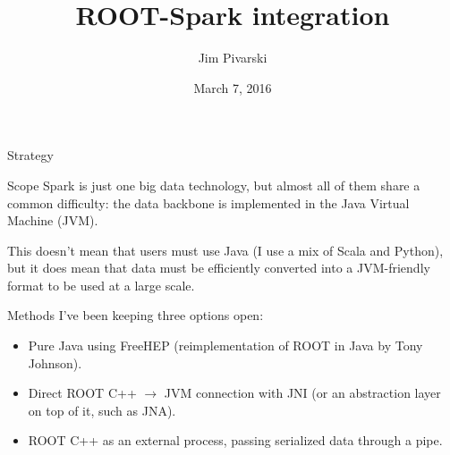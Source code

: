 \documentclass{beamer}
\title[2016-03-07-spark]{ROOT-Spark integration}
\author{Jim Pivarski}
\institute{Princeton Univeristy --- DIANA}
\date{March 7, 2016}
\begin{document}
\begin{frame}
  \titlepage
\end{frame}


\begin{frame}{Strategy}
\begin{block}{Scope}
Spark is just one big data technology, but almost all of them share a common difficulty: the data backbone is implemented in the Java Virtual Machine (JVM).

\vspace{0.2 cm}
This doesn't mean that users must use Java (I use a mix of Scala and Python), but it does mean that data must be efficiently converted into a JVM-friendly format to be used at a large scale.
\end{block}

\begin{block}{Methods}
I've been keeping three options open:
\begin{itemize}
\item Pure Java using FreeHEP (reimplementation of ROOT in Java by Tony Johnson).
\item Direct ROOT C++ $\to$ JVM connection with JNI (or an abstraction layer on top of it, such as JNA).
\item ROOT C++ as an external process, passing serialized data through a pipe.
\end{itemize}
\end{block}

\end{frame}
\end{document}

